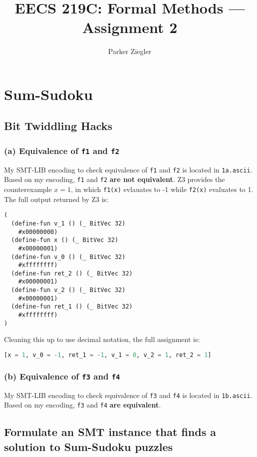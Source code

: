 \documentclass{article}
\title{EECS 219C: Formal Methods — Assignment 2}
\author{Parker Ziegler}
\newcommand{\code}[1]{\texttt{#1}}
\begin{document}
\maketitle

\section{Sum-Sudoku}

\subsection{Bit Twiddling Hacks}

\subsubsection{(a) Equivalence of \code{f1} and \code{f2}}

\noindent My SMT-LIB encoding to check equivalence of \code{f1} and \code{f2} is located in \code{1a.ascii}. Based on my encoding, \code{f1} and \code{f2} \textbf{are not equivalent}. Z3 provides the counterexample $x = 1$, in which \code{f1(x)} evlauates to -1 while \code{f2(x)} evaluates to 1. The full output returned by Z3 is:

\begin{lstlisting}
(
  (define-fun v_1 () (_ BitVec 32)
    #x00000000)
  (define-fun x () (_ BitVec 32)
    #x00000001)
  (define-fun v_0 () (_ BitVec 32)
    #xffffffff)
  (define-fun ret_2 () (_ BitVec 32)
    #x00000001)
  (define-fun v_2 () (_ BitVec 32)
    #x00000001)
  (define-fun ret_1 () (_ BitVec 32)
    #xffffffff)
)
\end{lstlisting}

\noindent Cleaning this up to use decimal notation, the full assignment is:

\begin{lstlisting}[language=Python]
[x = 1, v_0 = -1, ret_1 = -1, v_1 = 0, v_2 = 1, ret_2 = 1]
\end{lstlisting}

\subsubsection{(b) Equivalence of \code{f3} and \code{f4}}

\noindent My SMT-LIB encoding to check equivalence of \code{f3} and \code{f4} is located in \code{1b.ascii}. Based on my encoding, \code{f3} and \code{f4} \textbf{are equivalent}.

\subsection{Formulate an SMT instance that finds a solution to Sum-Sudoku puzzles}
\end{document}

